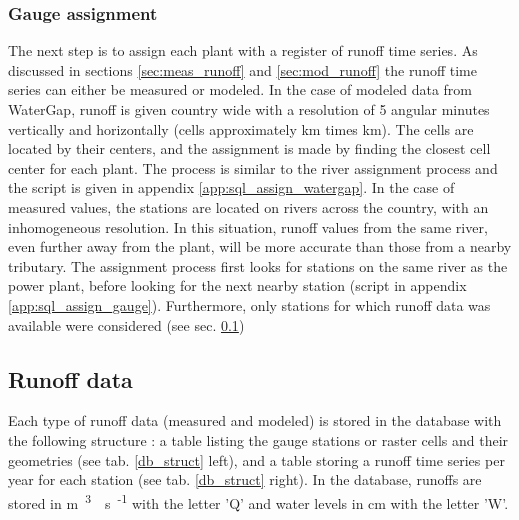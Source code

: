 \subsubsection*{Gauge assignment}
The next step is to assign each plant with a register of runoff time series. As discussed in sections \ref{sec:meas_runoff} and \ref{sec:mod_runoff} the runoff time series can either be measured or modeled. \newline
In the case of modeled data from WaterGap, runoff is given country wide with a resolution of 5 angular minutes vertically and horizontally (cells approximately \unit[9]{km} times \unit[6]{km}). The cells are located by their centers, and the assignment is made by finding the closest cell center for each plant. The process is similar to the river assignment process and the script is given in appendix \ref{app:sql_assign_watergap}. \newline
In the case of measured values, the stations are located on rivers across the country, with an inhomogeneous resolution. In this situation, runoff values from the same river, even further away from the plant, will be more accurate than those from a nearby tributary. The assignment process first looks for stations on the same river as the power plant, before looking for the next nearby station (script in appendix \ref{app:sql_assign_gauge}). Furthermore, only stations for which runoff data was available were considered (see sec. \ref{sec:runoff_data})

\subsection{Runoff data}
\label{sec:runoff_data}

Each type of runoff data (measured and modeled) is stored in the database with the following structure : a table listing the gauge stations or raster cells and their geometries (see tab. \ref{db_struct} left), and a table storing a runoff time series per year for each station (see tab. \ref{db_struct} right). In the database, runoffs are stored in \unit{m\textsuperscript{3}\textperiodcentered s\textsuperscript{-1}} with the letter 'Q' and water levels in \unit{cm} with the letter 'W'.


